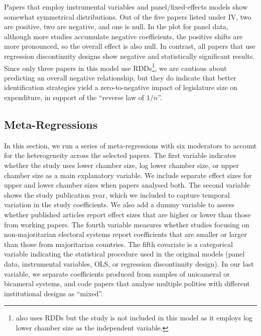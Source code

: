 \documentclass[11pt,a4paper,]{article}
\begin{document}
Papers that employ instrumental variables and panel/fixed-effects models
show somewhat symmetrical distributions. Out of the five papers listed
under IV, two are positive, two are negative, and one is null. In the
plot for panel data, although more studies accumulate negative
coefficients, the positive shifts are more pronounced, so the overall
effect is also null. In contrast, all papers that use regression
discontinuity designs show negative and statistically significant
results. Since only three papers in this model use RDDs\footnote{\citet{petterssonlidbom2012size}
  also uses RDDs but the study is not included in this model as it
  employs log lower chamber size as the independent variable.}, we are
cautious about predicting an overall negative relationship, but they do
indicate that better identification strategies yield a zero-to-negative
impact of legislature size on expenditure, in support of the ``reverse
law of \(1/n\)''.

\hypertarget{meta-regressions}{%
\subsection{Meta-Regressions}\label{meta-regressions}}

\label{sub:regressions}

In this section, we run a series of meta-regressions with six moderators
to account for the heterogeneity across the selected papers. The first
variable indicates whether the study uses lower chamber size, log lower
chamber size, or upper chamber size as a main explanatory variable. We
include separate effect sizes for upper and lower chamber sizes when
papers analysed both. The second variable shows the study publication
year, which we included to capture temporal variation in the study
coefficients. We also add a dummy variable to assess whether published
articles report effect sizes that are higher or lower than those from
working papers. The fourth variable measures whether studies focusing on
non-majoritarian electoral systems report coefficients that are smaller
or larger than those from majoritarian countries. The fifth covariate is
a categorical variable indicating the statistical procedure used in the
original models (panel data, instrumental variables, OLS, or regression
discontinuity design). In our last variable, we separate coefficients
produced from samples of unicameral or bicameral systems, and code
papers that analyse multiple polities with different institutional
designs as ``mixed''.
\end{document}
